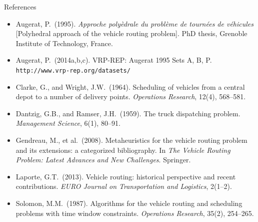 \documentclass[aspectratio=169,10pt]{beamer}
\begin{document}
\begin{frame}[allowframebreaks]{References}

  \begin{itemize}
    \item Augerat, P.\ (1995). \textit{Approche poly\`edrale du probl\`eme de
      tourn\'ees de v\'ehicules} [Polyhedral approach of the vehicle routing
      problem]. PhD thesis, Grenoble Institute of Technology, France.

    \item Augerat, P.\ (2014a,b,c). VRP-REP: Augerat 1995 Sets A, B, P.
      \texttt{http://www.vrp-rep.org/datasets/}

    \item Clarke, G., and Wright, J.W.\ (1964). Scheduling of vehicles from a
      central depot to a number of delivery points. \textit{Operations Research},
      12(4), 568--581.

    \item Dantzig, G.B., and Ramser, J.H.\ (1959). The truck dispatching
      problem. \textit{Management Science}, 6(1), 80--91.

    \item Gendreau, M., et al.\ (2008). Metaheuristics for the vehicle routing
      problem and its extensions: a categorized bibliography. In
      \textit{The Vehicle Routing Problem: Latest Advances and New Challenges}.
      Springer.

    \item Laporte, G.T.\ (2013). Vehicle routing: historical perspective and
      recent contributions. \textit{EURO Journal on Transportation and
      Logistics}, 2(1--2).

    \item Solomon, M.M.\ (1987). Algorithms for the vehicle routing and
      scheduling problems with time window constraints. \textit{Operations
      Research}, 35(2), 254--265.
  \end{itemize}

\end{frame}
\end{document}
